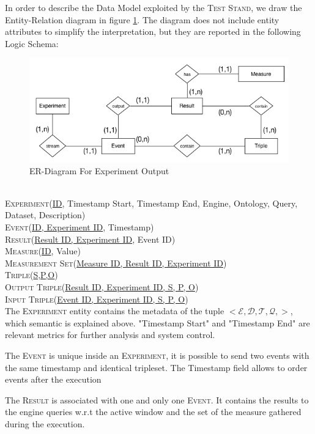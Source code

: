 \noindent In order to describe the Data Model exploited by the \textsc{Test Stand}, we draw the Entity-Relation diagram in figure \ref{fig:er}. The diagram does not include entity attributes to simplify the interpretation, but they are reported in the following Logic Schema:
\begin{figure}[tbh]
  \centering
	\includegraphics[width=\linewidth]{images/er-db}
	\caption{ER-Diagram For Experiment Output} 
  	\label{fig:er}
\end{figure}\\
\noindent\textsc{Experiment}(\underline{ID}, Timestamp Start, Timestamp End, Engine, Ontology, Query, Dataset, Description)\\
\textsc{Event}(\underline{ID, Experiment ID}, Timestamp)\\
\textsc{Result}(\underline{Result ID, Experiment ID}, Event ID)\\
\textsc{Measure}(\underline{ID}, Value)\\
\textsc{Measurement Set}(\underline{Measure ID, Result ID, Experiment ID})\\
\textsc{Triple}(\underline{S,P,O})\\
\textsc{Output Triple}(\underline{Result ID, Experiment ID, S, P, O})\\
\textsc{Input Triple}(\underline{Event ID, Experiment ID, S, P, O})\\

The \textsc{Experiment} entity contains the metadata of the tuple $<\mathcal{E},\mathcal{D},\mathcal{T},\mathcal{Q},>$, which semantic is explained above. "Timestamp Start" and "Timestamp End" are relevant metrics for further analysis and system control. 

The \textsc{Event} is unique inside an \textsc{Experiment}, it is possible to send two events with the same timestamp and identical tripleset. The Timestamp field allows to order events after the execution

The \textsc{Result} is associated with one and only one \textsc{Event}. It contains the results to the engine queries w.r.t the active window and the set of the measure gathered during the execution. 

